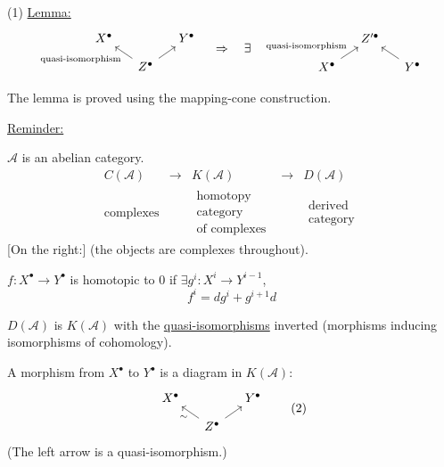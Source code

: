 (1) \underline{Lemma:}
\begin{equation*}
\begin{tikzcd}[column sep=small,row sep=small]
X^\bullet && Y^\bullet\\
& Z^\bullet \arrow[ul,"{\text{quasi-isomorphism}}"] \arrow[ur] &
\end{tikzcd}
\quad\Rightarrow\quad\exists\quad
\begin{tikzcd}[column sep=small,row sep=small]
& Z'^\bullet &\\
X^\bullet \arrow[ur,"{\text{quasi-isomorphism}}"] && Y^\bullet \arrow[ul]
\end{tikzcd}
\end{equation*}

The lemma is proved using the mapping-cone construction.

\underline{Reminder:}

$\mathcal{A}$ is an abelian category.
\begin{equation*}
\begin{array}{ccccc}
C(\mathcal{A}) & \longrightarrow & K(\mathcal{A}) & \longrightarrow & D(\mathcal{A})\\
\text{complexes} && \substack{\text{homotopy}\\\text{category}\\\text{of complexes}} &&
\substack{\text{derived}\\\text{category}}
\end{array}
\end{equation*}
[On the right:] (the objects are complexes throughout).

$f:X^\bullet\to Y^\bullet$ is homotopic to $0$ if
$\exists g^i:X^i\to Y^{i-1}$,
\begin{equation*}
f^i=dg^i+g^{i+1}d
\end{equation*}

$D(\mathcal{A})$ is $K(\mathcal{A})$ with the
\underline{quasi-isomorphisms} inverted
(morphisms inducing isomorphisms of cohomology).

A morphism from $X^\bullet$ to $Y^\bullet$ is a diagram in $K(\mathcal{A})$:
\begin{equation*}
\begin{tikzcd}[column sep=small,row sep=small]
X^\bullet && Y^\bullet\\
& Z^\bullet \arrow[ul,"\sim"] \arrow[ur] &
\end{tikzcd}
\tag{2}
\end{equation*}
(The left arrow is a quasi-isomorphism.)

